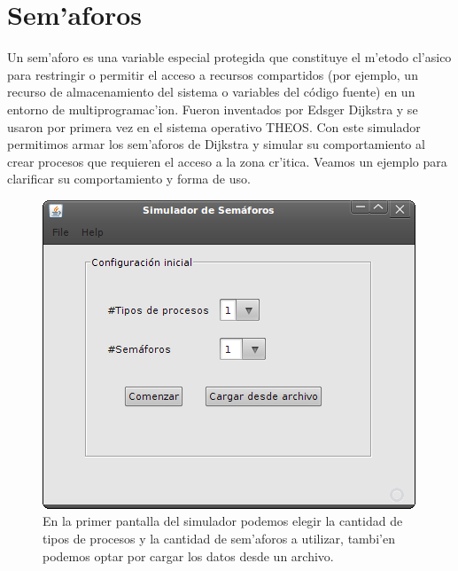 \section{Sem'aforos}
Un sem'aforo es una variable especial protegida que constituye el m'etodo cl'asico para restringir o permitir el acceso a recursos compartidos (por ejemplo, un recurso de almacenamiento del sistema o variables del código fuente) en un entorno de multiprogramac'ion. Fueron inventados por Edsger Dijkstra y se usaron por primera vez en el sistema operativo THEOS.
Con este simulador permitimos armar los sem'aforos de Dijkstra y simular su comportamiento al crear procesos que requieren el acceso a la zona cr'itica.
Veamos un ejemplo para clarificar su comportamiento y forma de uso.

\begin{figure}
\centering
 \includegraphics[scale=0.4,keepaspectratio=true]{./imagenes/semaforo/semaforos1.png}
 \caption{En la primer pantalla del simulador podemos elegir la cantidad de tipos de procesos y la cantidad de sem'aforos a utilizar, tambi'en podemos optar por cargar los datos desde un archivo.}
\end{figure}

